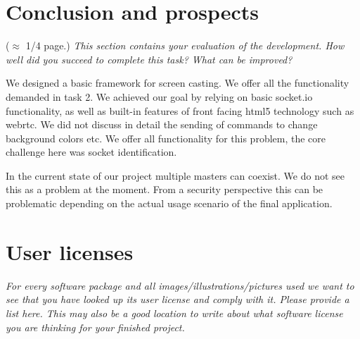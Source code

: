 \documentclass[a4paper,11pt]{article}
\newcommand{\note}[1]{{\colorbox{yellow!40!white}{#1}}}
\newcommand{\exampletext}[1]{{\color{blue!60!black}#1}}
\begin{document}
\section{Conclusion and prospects}\label{sec:conclusion}

\note{($\approx$ 1/4 page.)}
\exampletext{\textit{This section contains your evaluation of the development. How well did you succeed to complete this task? What can be improved?}}

\exampletext{We designed a basic framework for screen casting. We offer all the functionality demanded in task 2. We achieved our goal by relying on basic socket.io functionality, as well as built-in features of front facing html5 technology such as webrtc. We did not discuss in detail the sending of commands to change background colors etc. We offer all functionality for this problem, the core challenge here was socket identification.

In the current state of our project multiple masters can coexist. We do not see this as a problem at the moment. From a security perspective this can be problematic depending on the actual usage scenario of the final application.}


\appendix

\section{User licenses}

\exampletext{\textit{For every software package and all images/illustrations/pictures used we want to see that you have looked up its user license and comply with it. Please provide a list here. This may also be a good location to write about what software license you are thinking for your finished project.}}






\end{document}
